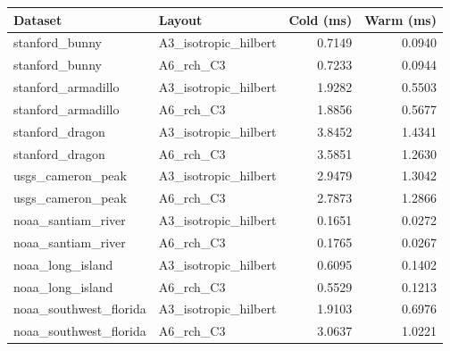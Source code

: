 \begin{tabular}{llrr}
Dataset & Layout & Cold (ms) & Warm (ms) \\
\hline
stanford\_bunny & A3\_isotropic\_hilbert & 0.7149 & 0.0940 \\
stanford\_bunny & A6\_rch\_C3 & 0.7233 & 0.0944 \\
stanford\_armadillo & A3\_isotropic\_hilbert & 1.9282 & 0.5503 \\
stanford\_armadillo & A6\_rch\_C3 & 1.8856 & 0.5677 \\
stanford\_dragon & A3\_isotropic\_hilbert & 3.8452 & 1.4341 \\
stanford\_dragon & A6\_rch\_C3 & 3.5851 & 1.2630 \\
usgs\_cameron\_peak & A3\_isotropic\_hilbert & 2.9479 & 1.3042 \\
usgs\_cameron\_peak & A6\_rch\_C3 & 2.7873 & 1.2866 \\
noaa\_santiam\_river & A3\_isotropic\_hilbert & 0.1651 & 0.0272 \\
noaa\_santiam\_river & A6\_rch\_C3 & 0.1765 & 0.0267 \\
noaa\_long\_island & A3\_isotropic\_hilbert & 0.6095 & 0.1402 \\
noaa\_long\_island & A6\_rch\_C3 & 0.5529 & 0.1213 \\
noaa\_southwest\_florida & A3\_isotropic\_hilbert & 1.9103 & 0.6976 \\
noaa\_southwest\_florida & A6\_rch\_C3 & 3.0637 & 1.0221 \\
\end{tabular}
